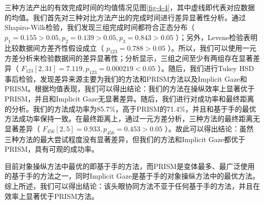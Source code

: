 三种方法产出的有效完成时间的均值情况见图\ref{fig-4-4}，其中虚线即代表对应数据的均值。我们首先对三种对比方法产出的完成时间进行差异显著性分析。通过Shapiro-Wilk检验，我们发现三组完成时间都符合正态分布（ $p_1 = 0.155 > 0.05, p_2 = 0.139 > 0.05, p_3 = 0.843 > 0.05$ ）；另外，Levene检验表明比较数据间方差齐性假设成立（ $p_{123} = 0.788 > 0.05$ ）。所以，我们可以使用一元方差分析来检验数据间的差异显著性；分析显示，三组之间至少有两组存在显著差异（ $F_{123}[2, 31] = 7.119, p_{123} = 0.000219 < 0.05$ ）。随后，我们进行Tukey HSD事后检验，发现差异来源主要为我们的方法和PRISM方法以及Implicit Gaze和PRISM。根据均值表现，我们可以得出结论：我们的方法在操纵效率上显著优于PRISM，并且和Implicit Gaze无显著差异。随后，我们进行对成功率和最终距离的分析。我们的方法成功率为85.7\%，高于PRISM的71.4\%，并且和基于手的最优方法成功率保持一致。在最终距离上，通过一元方差分析，三种方法的最终距离无显著差异（ $F_{456}[2, 5] = 0.933, p_{456} = 0.453 > 0.05$ ）。故此可以得出结论：虽然三种方法的最大尝试程度没有显著差异，但我们的方法和Implicit Gaze都优于PRISM，具有可观的成功率。

目前对象操纵方法中最优的即基于手的方法，而PRISM是变体最多、最广泛使用的基于手的方法之一，同时Implicit Gaze是基于手的对象操纵方法中的最优方法。综上所述，我们可以得出结论：该头眼协同方法不亚于任何基于手的方法，并且在效率上显著优于PRISM方法。

